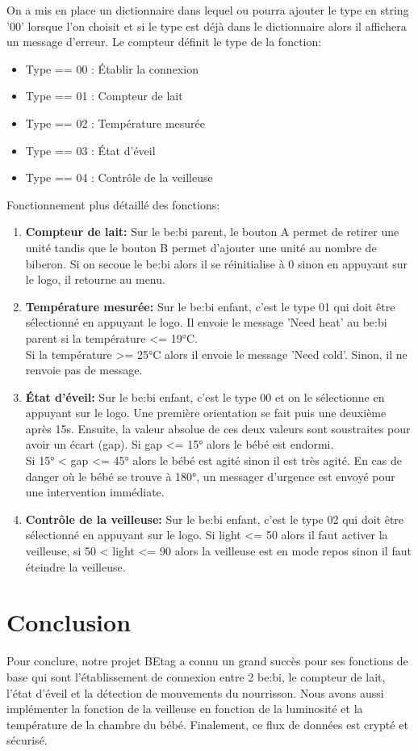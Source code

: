 \documentclass [11pt]{article}
\begin{document}
\noindent On a mis en place un dictionnaire dans lequel ou pourra ajouter le type en string '00' lorsque l'on choisit et si le type est déjà dans le dictionnaire alors il affichera un message d'erreur. Le compteur définit le type de la fonction\string:
\begin{itemize}
    \item[\textbullet] Type == 00 : Établir la connexion
    \item[\textbullet] Type == 01 : Compteur de lait
    \item[\textbullet] Type == 02 : Température mesurée
    \item[\textbullet] Type == 03 : État d'éveil
    \item[\textbullet] Type == 04 : Contrôle de la veilleuse
\end{itemize}
\newpage
\noindent Fonctionnement plus détaillé des fonctions:
\begin{enumerate}
    \item \textbf{Compteur de lait\string:} Sur le be\string:bi parent, le bouton A permet de retirer une unité tandis que le bouton B permet d'ajouter une unité au nombre de biberon. Si on secoue le be\string:bi alors il se réinitialise à 0 sinon en appuyant sur le logo, il retourne au menu.
    \item \textbf{Température mesurée\string:} Sur le be\string:bi enfant, c'est le type 01 qui doit être sélectionné en appuyant le logo. Il envoie le message 'Need heat' au be\string:bi parent si la température <= 19°C. 
    \\Si la température >= 25°C alors il envoie le message 'Need cold'. Sinon, il ne renvoie pas de message.
    \item \textbf{État d'éveil\string:} Sur le be\string:bi enfant, c'est le type 00 et on le sélectionne en appuyant sur le logo. Une première orientation se fait puis une deuxième après 15s. Ensuite, la valeur absolue de ces deux valeurs sont soustraites pour avoir un écart (gap). Si gap <= 15° alors le bébé est endormi. 
    \\Si 15° < gap <= 45° alors le bébé est agité sinon il est très agité. En cas de danger où le bébé se trouve à 180°, un messager d'urgence est envoyé pour une intervention immédiate.
    \item \textbf{Contrôle de la veilleuse\string:} Sur le be\string:bi enfant, c'est le type 02 qui doit être sélectionné en appuyant sur le logo. Si light <= 50 alors il faut activer la veilleuse, si 50 < light <= 90 alors la veilleuse est en mode repos sinon il faut éteindre la veilleuse.
\end{enumerate}
\section{Conclusion}
Pour conclure, notre projet BEtag a connu un grand succès pour ses fonctions de base qui sont l'établissement de connexion entre 2 be\string:bi, le compteur de lait, l'état d'éveil et la détection de mouvements du nourrisson. Nous avons aussi implémenter la fonction de la veilleuse en fonction de la luminosité et la température de la chambre du bébé. Finalement, ce flux de données est crypté et sécurisé.
\end{document}

